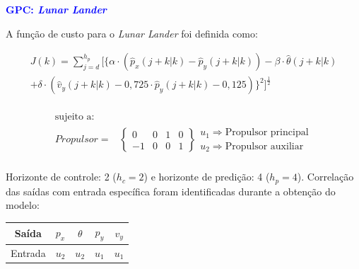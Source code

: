 \documentclass[aspectratio=169]{beamer}
\begin{document}
\begin{frame}{\textcolor{blue}{\textbf{GPC: \textit{Lunar Lander}}}}
\vspace{-0.65cm}

\justifying A função de custo para o \textit{Lunar Lander} foi definida como:

\begin{equation}
\label{eq:custogpc}
\begin{matrix}
    J(k) = \sum_{j=d}^{h_p}[\{\alpha\cdot (\hat{p}_x(j+k|k) - \hat{p}_y(j+k|k) )-\beta \cdot \hat{\theta}(j+k|k)\\
            +\delta \cdot  (\hat{v}_y(j+k|k)-0,725\cdot\hat{p}_y(j+k|k)-0,125)\}^2]^\frac{1}{2}\\
\end{matrix}
\end{equation}

\begin{equation*}
\begin{matrix}
  \text{sujeito a:} &  \\
  	Propulsor = & 
  	\left\{
  	\begin{matrix}
  	0 & 0 & 1 & 0\\
       -1  & 0 & 0 & 1 
	\end{matrix} 
	\right\} 
	\begin{matrix}
  	u_1 \Rightarrow\text{Propulsor principal}\\
    u_2 \Rightarrow\text{Propulsor auxiliar}
	\end{matrix}\\
\end{matrix}
\end{equation*}

\justifying Horizonte de controle: 2 ($h_c=2$) e horizonte de predição: 4 ($h_p=4$). Correlação das saídas com entrada específica foram identificadas durante a obtenção do modelo:

\begin{table}[H]
	\centering
	\vspace*{.05cm}
	\begin{tabular}{ccccc}
            \rowcolor{blue!30} Saída & $p_x$ & $\theta$ & $p_y$ & $v_y$ \\
            \hline
            Entrada & $u_2$ & $u_2$ & $u_1$ & $u_1$\\ 
            \hline
	\end{tabular}  
    \label{tab:intcartpole}                 %
\end{table}

\end{frame}
\end{document}
